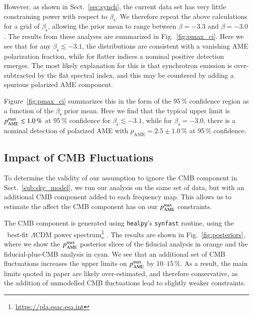 \documentclass[twocolumn]{aa}
\begin{document}
However, as shown in Sect.~\ref{sec:synch}, the current data set has
very little constraining power with respect to
$\beta_{\mathrm{s}}$. We therefore repeat the above calculations for a
grid of $\beta_{\mathrm{s}}$, allowing the prior mean to range between
$\beta=-3.3$ and $\beta=-3.0$. The results from these analyses are
summarized in Fig.~\ref{fig:pmax_ci}. Here we see that for any
$\beta_{\mathrm{s}}\lesssim-3.1$, the distributions are consistent
with a vanishing AME polarization fraction, while for flatter indices
a nominal positive detection emerges. The most likely explanation for
this is that synchrotron emission is over-subtracted by the flat
spectral index, and this may be countered by adding a spurious
polarized AME component. 

Figure~\ref{fig:pmax_ci} summarizes this in the
form of the 95\,\% confidence region as a function of the
$\beta_{\mathrm{s}}$ prior mean. Here we find that the typical upper
limit is $p_{\mathrm{AME}}^{\rm max}\lesssim1.0\,\%$ at 95\,\%
confidence for $\beta_{\mathrm{s}}\lesssim-3.1$, while for
$\beta_{\mathrm{s}}=-3.0$, there is a nominal detection of polarized
AME with $p_{\mathrm{AME}}=2.5\pm1.0\,\%$ at 95\,\% confidence. 

\subsection{Impact of CMB Fluctuations}
\label{sub:cmb_test}

To determine the validity of our assumption to ignore the CMB component in Sect.~\ref{sub:sky_model}, we run our analysis on the same set of data, but with an additional CMB component added to each frequency map. This allows us to estimate the affect the CMB component has on our $p_{\rm AME}^{\rm max}$ constraints. 

The CMB component is generated using \texttt{healpy}'s \citep{Zonca2019} \texttt{synfast} routine, using the \Planck\ best-fit $\Lambda$CDM power spectrum\footnote{\url{https://pla.esac.esa.int}} \citep{planck2016-l05}. The results are shown in Fig.~\ref{fig:posteriors}, where we show the $p_{\rm AME}^{\rm max}$ posterior slices of the fiducial analysis in orange and the fiducial-plus-CMB analysis in cyan. We see that an additional set of CMB fluctuations increases the upper limits on $p_{\rm AME}^{\rm max}$ by 10--$15\,\%$. As a result, the main limits quoted in paper are likely over-estimated, and therefore conservative, as the addition of unmodelled CMB fluctuations lead to slightly weaker constraints.
\end{document}
